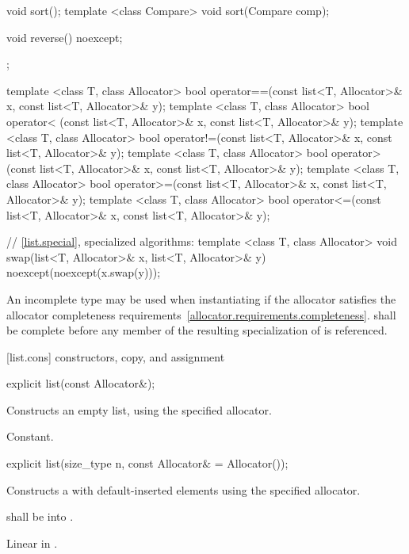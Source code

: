 \begin{codeblock}
{{    void sort();
    template <class Compare> void sort(Compare comp);

    void reverse() noexcept;
  };

  template <class T, class Allocator>
    bool operator==(const list<T, Allocator>& x, const list<T, Allocator>& y);
  template <class T, class Allocator>
    bool operator< (const list<T, Allocator>& x, const list<T, Allocator>& y);
  template <class T, class Allocator>
    bool operator!=(const list<T, Allocator>& x, const list<T, Allocator>& y);
  template <class T, class Allocator>
    bool operator> (const list<T, Allocator>& x, const list<T, Allocator>& y);
  template <class T, class Allocator>
    bool operator>=(const list<T, Allocator>& x, const list<T, Allocator>& y);
  template <class T, class Allocator>
    bool operator<=(const list<T, Allocator>& x, const list<T, Allocator>& y);

  // \ref{list.special}, specialized algorithms:
  template <class T, class Allocator>
    void swap(list<T, Allocator>& x, list<T, Allocator>& y)
      noexcept(noexcept(x.swap(y)));
}
\end{codeblock}

\pnum
An incomplete type  may be used when instantiating 
if the allocator satisfies the
allocator completeness requirements~\ref{allocator.requirements.completeness}.
 shall be complete before any member of the resulting specialization
of  is referenced.

[list.cons]{ constructors, copy, and assignment}

%
\begin{itemdecl}
explicit list(const Allocator&);
\end{itemdecl}

\begin{itemdescr}
\pnum
\effects
Constructs an empty list, using the specified allocator.

\pnum
\complexity
Constant.
\end{itemdescr}

%
\begin{itemdecl}
explicit list(size_type n, const Allocator& = Allocator());
\end{itemdecl}

\begin{itemdescr}
\pnum
\effects Constructs a  with
 default-inserted elements using the specified allocator.

\pnum
\requires {} shall be  into .

\pnum
\complexity
Linear in
.
\end{itemdescr}

